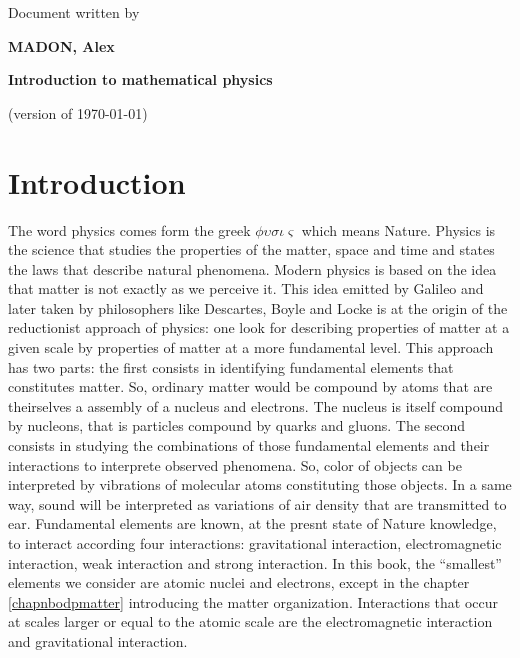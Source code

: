 \documentclass[12pt]{book}
\newif\ifpdf\ifx\pdfoutput\undefined\pdffalse\else\pdfoutput=1\pdftrue\fi
\begin{document}
\ifpdf{}\else\fi
\def\tiii{
\begin{titlepage}

\begin{center}
\null
\par
\vspace{20mm}

{Document written by}

\vspace{5mm}

{\large\bf MADON, Alex}

\vspace{15mm}

{\Large\bf Introduction to mathematical physics}

\vspace{10mm}





\vspace{65mm}

(version of \today)
\end{center}
\end{titlepage}
}%
\tiii
\tableofcontents


\chapter{Introduction}
The word physics comes form the greek $\phi\upsilon\sigma\iota\varsigma$
which means Nature. Physics is the science that studies the properties of the
matter, space and time and states the laws that describe natural phenomena.
Modern physics is based on the idea that matter is not exactly as we perceive
it. This idea emitted by Galileo and later taken by philosophers like
Descartes, 
Boyle and Locke is at the origin of the reductionist approach of physics: one
look for describing properties of matter at a given scale by
properties of matter at a more 
fundamental level. This approach has two parts: the first consists in
identifying 
fundamental elements that constitutes matter. So, ordinary matter
would be compound by atoms that are theirselves a assembly 
of a nucleus and electrons. The nucleus is itself compound by nucleons, that is
particles compound by quarks and gluons. 
The second consists in studying
the combinations of those fundamental elements and their interactions to
interprete observed phenomena. So, color of objects can be interpreted by
vibrations of molecular atoms constituting those objects.
In a same way, sound will be interpreted as variations of air density that are
transmitted to ear.
Fundamental elements are known, at the presnt state of Nature
knowledge, to interact according four interactions:
gravitational interaction, electromagnetic interaction, weak interaction and
strong interaction. In this book, the ``smallest'' elements we consider are
atomic nuclei and electrons, except in the chapter
\ref{chapnbodpmatter} introducing the matter
organization. Interactions that occur at scales larger or equal to the
atomic scale are the electromagnetic
interaction and gravitational interaction. 
\end{document}
